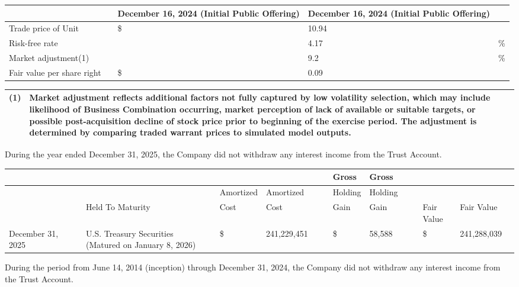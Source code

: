 \documentclass[11pt,a4paper]{article}
\begin{document}
\begin{table}[h]
\begin{tabular}{|l|l|l|l|l|}
\hline
 &  & \textbf{December 16, 2024}  \textbf{(Initial Public Offering)} & \textbf{December 16, 2024}  \textbf{(Initial Public Offering)} &  \\ \hline
Trade price of Unit &  & \$ & 10.94 &  \\ \hline
Risk-free rate &  &  & 4.17 & \% \\ \hline
Market adjustment(1) &  &  & 9.2 & \% \\ \hline
Fair value per share right &  & \$ & 0.09 &  \\ \hline
\end{tabular}
\end{table}

\begin{table}[h]
\begin{tabular}{|l|l|}
\hline
(1) & Market adjustment reflects additional factors not fully captured by low volatility selection, which may include likelihood of Business Combination occurring, market perception of lack of available or suitable targets, or possible post-acquisition decline of stock price prior to beginning of the exercise period. The adjustment is determined by comparing traded warrant prices to simulated model outputs. \\ \hline
\end{tabular}
\end{table}

During the year ended December 31, 2025, the Company did not withdraw any interest income from the Trust Account.

\begin{table}[h]
\begin{tabular}{|l|l|l|l|l|l|l|l|l|l|l|l|l|l|l|l|}
\hline
 &  &  &  &  &  &  &  &  & Gross & Gross &  &  &  &  &  \\ \hline
 &  &  &  &  & Amortized & Amortized &  &  & Holding & Holding &  &  &  &  &  \\ \hline
 &  &  & Held To Maturity &  & Cost & Cost &  &  & Gain & Gain &  &  & Fair Value & Fair Value &  \\ \hline
December 31, 2025 &  &  & U.S. Treasury Securities (Matured on January 8, 2026) &  & \$ & 241,229,451 &  &  & \$ & 58,588 &  &  & \$ & 241,288,039 &  \\ \hline
\end{tabular}
\end{table}

During the period from June 14, 2014 (inception) through December 31, 2024, the Company did not withdraw any interest income from the Trust Account.
\end{document}
